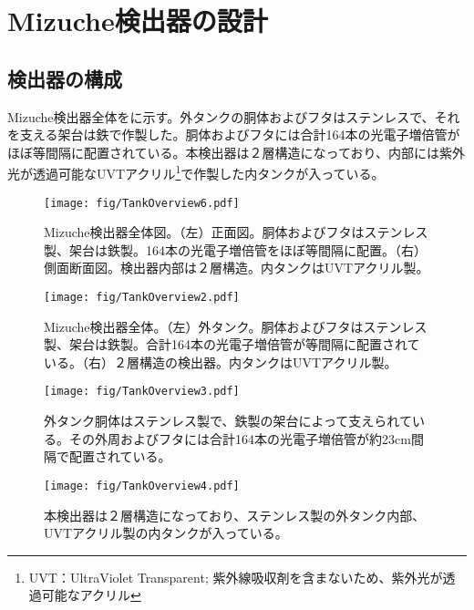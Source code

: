 \chapter{Mizuche検出器の設計}
\section{検出器の構成}
Mizuche検出器全体をに示す。外タンクの胴体およびフタはステンレスで、それを支える架台は鉄で作製した。胴体およびフタには合計164本の光電子増倍管がほぼ等間隔に配置されている。本検出器は２層構造になっており、内部には紫外光が透過可能なUVTアクリル\footnote{UVT：UltraViolet Transparent; 紫外線吸収剤を含まないため、紫外光が透過可能なアクリル}で作製した内タンクが入っている。


\begin{figure}[htbp]
\centering
\texttt{[image: fig/TankOverview6.pdf]}
\caption[Mizuche検出器全体図]{Mizuche検出器全体図。（左）正面図。胴体およびフタはステンレス製、架台は鉄製。164本の光電子増倍管をほぼ等間隔に配置。（右）側面断面図。検出器内部は２層構造。内タンクはUVTアクリル製。}
\label{TankOverview}
\end{figure}

\begin{figure}[htbp]
\centering
\texttt{[image: fig/TankOverview2.pdf]}
\caption[Mizuche検出器全体]{Mizuche検出器全体。（左）外タンク。胴体およびフタはステンレス製、架台は鉄製。合計164本の光電子増倍管が等間隔に配置されている。（右）２層構造の検出器。内タンクはUVTアクリル製。}
\label{TankOverview}
\end{figure}
\fi%


\begin{figure}[htbp]
\begin{minipage}{0.47\textwidth}
\centering
\texttt{[image: fig/TankOverview3.pdf]}
\caption[Mizuche検出器の外観]{外タンク胴体はステンレス製で、鉄製の架台によって支えられている。その外周およびフタには合計164本の光電子増倍管が約23cm間隔で配置されている。}
\label{fig:one}
\end{minipage}
\hfil
\begin{minipage}{0.47\textwidth}
\centering
\texttt{[image: fig/TankOverview4.pdf]}
\caption[Mizuche検出器の外観（フタを取った状態）]{本検出器は２層構造になっており、ステンレス製の外タンク内部、UVTアクリル製の内タンクが入っている。}
\label{fig:two}
\end{minipage}
\end{figure}
\fi%

